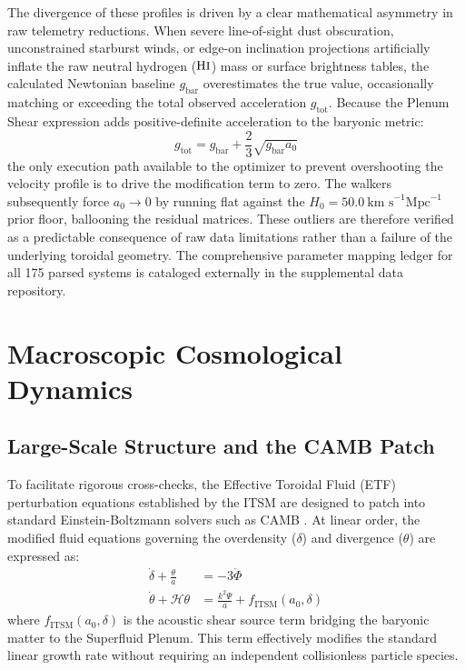 \documentclass[aps,prd,10pt,onecolumn,superscriptaddress,nofootinbib]{revtex4-2}
\begin{document}
The divergence of these profiles is driven by a clear mathematical asymmetry in raw telemetry reductions. When severe line-of-sight dust obscuration, unconstrained starburst winds, or edge-on inclination projections artificially inflate the raw neutral hydrogen ($\text{H\small I}$) mass or surface brightness tables, the calculated Newtonian baseline $g_{\text{bar}}$ overestimates the true value, occasionally matching or exceeding the total observed acceleration $g_{\text{tot}}$. Because the Plenum Shear expression adds positive-definite acceleration to the baryonic metric:
\begin{equation}
g_{\text{tot}} = g_{\text{bar}} + \frac{2}{3}\sqrt{g_{\text{bar}} a_0}
\end{equation}
the only execution path available to the optimizer to prevent overshooting the velocity profile is to drive the modification term to zero. The walkers subsequently force $a_0 \to 0$ by running flat against the $H_0 = 50.0 \ \text{km s}^{-1} \text{Mpc}^{-1}$ prior floor, ballooning the residual matrices. These outliers are therefore verified as a predictable consequence of raw data limitations rather than a failure of the underlying toroidal geometry. The comprehensive parameter mapping ledger for all 175 parsed systems is cataloged externally in the supplemental data repository.

\section{Macroscopic Cosmological Dynamics}

\subsection{Large-Scale Structure and the CAMB Patch}
To facilitate rigorous cross-checks, the Effective Toroidal Fluid (ETF) perturbation equations established by the ITSM are designed to patch into standard Einstein-Boltzmann solvers such as CAMB \cite{camb}. At linear order, the modified fluid equations governing the overdensity ($\delta$) and divergence ($\theta$) are expressed as:
\begin{align}
\dot{\delta} + \frac{\theta}{a} &= -3\dot{\Phi} \\
\dot{\theta} + \mathcal{H}\theta &= \frac{k^2\Psi}{a} + f_{\text{ITSM}}(a_0, \delta)
\end{align}
where $f_{\text{ITSM}}(a_0, \delta)$ is the acoustic shear source term bridging the baryonic matter to the Superfluid Plenum. This term effectively modifies the standard linear growth rate without requiring an independent collisionless particle species.
\end{document}
